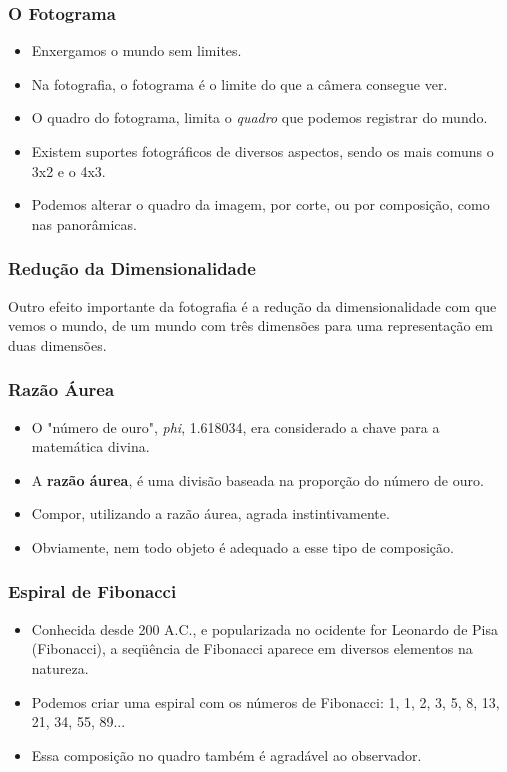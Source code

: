 \begin{frame}
    \frametitle{O Fotograma}
    \begin{itemize}
      \item Enxergamos o mundo sem limites.
      \item Na fotografia, o fotograma é o limite do que a câmera consegue ver.
      \item O quadro do fotograma, limita o \textit{quadro} que podemos registrar do mundo.
      \item Existem suportes fotográficos de diversos aspectos, sendo os mais comuns o 3x2 e o 4x3.
      \item Podemos alterar o quadro da imagem, por corte, ou por composição, como nas panorâmicas.
    \end{itemize}
\end{frame}

\begin{frame}
    \frametitle{Redução da Dimensionalidade}
    Outro efeito importante da fotografia é a redução da dimensionalidade com que vemos o mundo,
    de um mundo com três dimensões para uma representação em duas dimensões.
\end{frame}

\begin{frame}
    \frametitle{Razão Áurea}
    \begin{itemize}
      \item O "número de ouro", \textit{phi}, 1.618034, era considerado a chave
      para a matemática divina.
      \item A \textbf{razão áurea}, é uma divisão baseada na proporção do número de ouro.
      \item Compor, utilizando a razão áurea, agrada instintivamente.
      \item Obviamente, nem todo objeto é adequado a esse tipo de composição.
    \end{itemize}
\end{frame}


\begin{frame}
    \frametitle{Espiral de Fibonacci}
    \begin{itemize}
      \item Conhecida desde 200 A.C., e popularizada no ocidente for Leonardo de Pisa (Fibonacci),
      a seqüência de Fibonacci aparece em diversos elementos na natureza.
      \item Podemos criar uma espiral com os números de Fibonacci: 1, 1, 2, 3, 5, 8, 13, 21, 34, 55, 89...
      \item Essa composição no quadro também é agradável ao observador.
    \end{itemize}
\end{frame}

